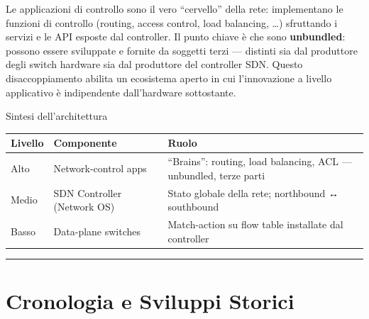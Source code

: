\documentclass[
  italian,
  openany]{book}
\newcounter{none} %
\begin{document}
Le applicazioni di controllo sono il vero ``cervello'' della rete:
implementano le funzioni di controllo (routing, access control, load
balancing, \ldots) sfruttando i servizi e le API esposte dal controller.
Il punto chiave è che sono \textbf{unbundled}: possono essere sviluppate
e fornite da soggetti terzi --- distinti sia dal produttore degli switch
hardware sia dal produttore del controller SDN. Questo disaccoppiamento
abilita un ecosistema aperto in cui l'innovazione a livello applicativo
è indipendente dall'hardware sottostante.

\begin{calloutnote}{Sintesi dell’architettura}

{\def\LTcaptype{none} %
\begin{longtable}[]{@{}
  >{\raggedright\arraybackslash}p{}
  >{\raggedright\arraybackslash}p{}
  >{\raggedright\arraybackslash}p{}@{}}
\toprule\noalign{}
\begin{minipage}[b]{\linewidth}\raggedright
Livello
\end{minipage} & \begin{minipage}[b]{\linewidth}\raggedright
Componente
\end{minipage} & \begin{minipage}[b]{\linewidth}\raggedright
Ruolo
\end{minipage} \\
\midrule\noalign{}
\endhead
\bottomrule\noalign{}
\endlastfoot
Alto & Network-control apps & ``Brains'': routing, load balancing, ACL
--- unbundled, terze parti \\
Medio & SDN Controller (Network OS) & Stato globale della rete;
northbound ↔ southbound \\
Basso & Data-plane switches & Match-action su flow table installate dal
controller \\
\end{longtable}
}

\end{calloutnote}

\begin{center}\rule{0.5\linewidth}{0.5pt}\end{center}

\section{Cronologia e Sviluppi
Storici}\label{cronologia-e-sviluppi-storici}
\end{document}
